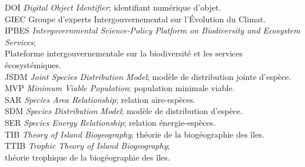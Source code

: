 \listeabrev
\begin{tabbing}
DOI \hspace{.8cm} \= \textit{Digital Object Identifier}; identifiant numérique d'objet. \\[.25cm]
GIEC \> Groupe d'experts Intergouvernemental sur l'Évolution du Climat. \\[.25cm]
IPBES \> \textit{Intergovernmental Science-Policy Platform on Biodiversity and Ecosystem} \\[-.25cm] \> \textit{Services}; \\[-.25cm]
\> Plateforme intergouvernementale sur la biodiversité et les services \\[-.25cm] \> écosystémiques. \\[.25cm]
JSDM \> \textit{Joint Species Distribution Model}; modèle de distribution jointe d'espèce. \\[.25cm]
MVP \> \textit{Minimum Viable Population}; population minimale viable. \\[.25cm]
SAR \> \textit{Species Area Relationship}; relation aire-espèces. \\[.25cm]
SDM \> \textit{Species Distribution Model}; modèle de distribution d'espèce. \\[.25cm]
SER \> \textit{Species Energy Relationship}; relation énergie-espèces. \\[.25cm]
TIB \> \textit{Theory of Island Biogeography}; théorie de la biogéographie des îles. \\[.25cm]
TTIB \> \textit{Trophic Theory of Island Biogeography}; \\[-.25cm]
\> théorie trophique de la biogéographie des îles.
\end{tabbing}
%



%
%



